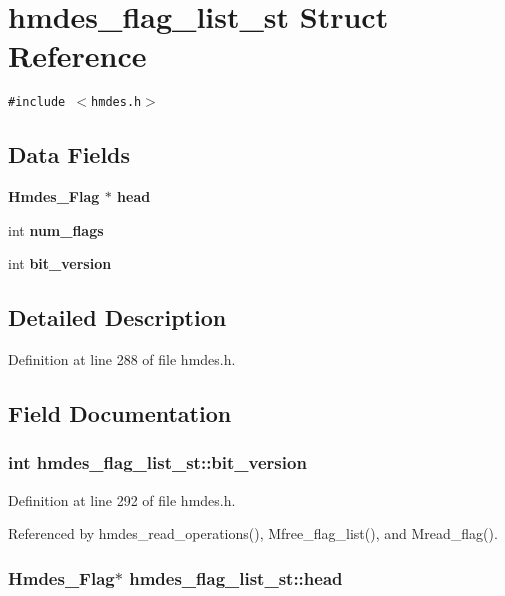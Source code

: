\section{hmdes\_\-flag\_\-list\_\-st Struct Reference}
\label{structhmdes__flag__list__st}
{\tt \#include $<$hmdes.h$>$}

\subsection*{Data Fields}
\begin{CompactItemize}
\item 
\bf{Hmdes\_\-Flag} $\ast$ \bf{head}
\item 
int \bf{num\_\-flags}
\item 
int \bf{bit\_\-version}
\end{CompactItemize}


\subsection{Detailed Description}




Definition at line 288 of file hmdes.h.

\subsection{Field Documentation}
\subsubsection{\setlength{\rightskip}{0pt plus 5cm}int \bf{hmdes\_\-flag\_\-list\_\-st::bit\_\-version}}\label{structhmdes__flag__list__st_cad4fbbc3820d213a683baad44df34d2}




Definition at line 292 of file hmdes.h.

Referenced by hmdes\_\-read\_\-operations(), Mfree\_\-flag\_\-list(), and Mread\_\-flag().
\subsubsection{\setlength{\rightskip}{0pt plus 5cm}\bf{Hmdes\_\-Flag}$\ast$ \bf{hmdes\_\-flag\_\-list\_\-st::head}}\label{structhmdes__flag__list__st_91f4e2c2f8124253fae2de37ba0bec9a}




